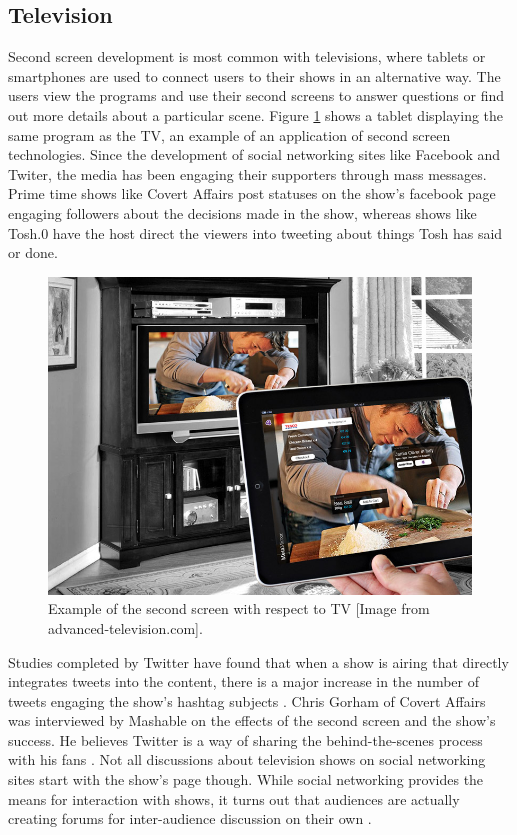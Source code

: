 \documentclass[11pt, oneside]{article}
\begin{document}
\subsection{Television} 
Second screen development is most common with televisions, where tablets or smartphones are used to connect users to their shows in an alternative way. The users view the programs and use their second screens to answer questions or find out more details about a particular scene. Figure \ref{second-screen} shows a tablet displaying the same program as the TV, an example of an application of second screen technologies. Since the development of social networking sites like Facebook and Twiter, the media has been engaging their supporters through mass messages. Prime time shows like Covert Affairs post statuses on the show's facebook page engaging followers about the decisions made in the show, whereas shows like Tosh.0 have the host direct the viewers into tweeting about things Tosh has said or done. 

\begin{figure}
    \centering
    \includegraphics[width=.8\textwidth]{second-screen.jpg}
    \caption{Example of the second screen with respect to TV [Image from advanced-television.com].}
    \label{second-screen}
\end{figure}

Studies completed by Twitter have found that when a show is airing that directly integrates tweets into the content, there is a major increase in the number of tweets engaging the show's hashtag subjects \cite{TwitterTV}. Chris Gorham of Covert Affairs was interviewed by Mashable on the effects of the second screen and the show's success. He believes Twitter is a way of sharing the behind-the-scenes process with his fans \cite{MashableChris}. Not all discussions about television shows on social networking sites start with the show's page though. While social networking provides the means for interaction with shows, it turns out that audiences are actually creating forums for inter-audience discussion on their own \cite{ACM}.
\end{document}
